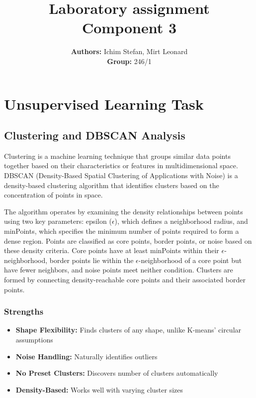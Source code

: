 \documentclass[a4paper, 11pt]{article}
\title{\textbf{Laboratory assignment} \\[1ex] \large \textbf{Component} {3}}
\author{\textbf{Authors:} {Ichim Stefan, Mirt Leonard}\\ \textbf{Group:} {246/1}}
\begin{document}
\maketitle

\section{Unsupervised Learning Task}
\subsection{Clustering and DBSCAN Analysis}

Clustering is a machine learning technique that groups similar data points together based on their characteristics or features in multidimensional space. DBSCAN (Density-Based Spatial Clustering of Applications with Noise) is a density-based clustering algorithm that identifies clusters based on the concentration of points in space.

The algorithm operates by examining the density relationships between points using two key parameters: epsilon ($\epsilon$), which defines a neighborhood radius, and minPoints, which specifies the minimum number of points required to form a dense region. Points are classified as core points, border points, or noise based on these density criteria. Core points have at least minPoints within their $\epsilon$-neighborhood, border points lie within the $\epsilon$-neighborhood of a core point but have fewer neighbors, and noise points meet neither condition. Clusters are formed by connecting density-reachable core points and their associated border points.

\subsubsection{Strengths}
\begin{itemize}
    \item \textbf{Shape Flexibility:} Finds clusters of any shape, unlike K-means' circular assumptions
    \item \textbf{Noise Handling:} Naturally identifies outliers
    \item \textbf{No Preset Clusters:} Discovers number of clusters automatically
    \item \textbf{Density-Based:} Works well with varying cluster sizes
\end{itemize}
\end{document}
